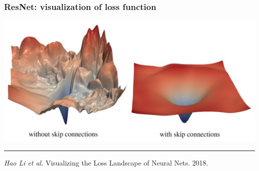 \documentclass[fullscreen=true, bookmarks=true, hyperref={pdfencoding=unicode}]{beamer}
\begin{document}
\begin{frame}
  \frametitle{ResNet: visualization of loss function}

\begin{center}
  \includegraphics[keepaspectratio,
                   width=0.7\paperwidth]{skip-connection-opt.jpg}
\end{center}

  \noindent\rule{8cm}{0.4pt}

  {\it Hao Li et al.} Visualizing the Loss Landscape of Neural Nets. 2018.

\end{frame}
\end{document}
